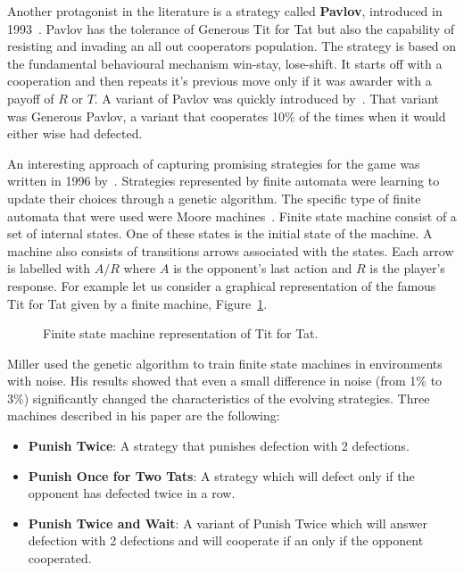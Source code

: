 \documentclass{article}
\theoremstyle{definition}
\begin{document}
Another protagonist in the literature is a strategy called \textbf{Pavlov},
introduced in 1993~\cite{Nowak1993}. Pavlov has the tolerance of Generous Tit for Tat
but also the capability of resisting and invading an all out cooperators population.
The strategy is based on the fundamental behavioural mechanism win-stay,
lose-shift. It starts off with a cooperation and then repeats it's previous move
only if it was awarder with a payoff of \(R\) or \(T\). A variant of Pavlov
was quickly introduced by~\cite{Wu1995}. That variant was Generous Pavlov, a variant
that cooperates 10\% of the times when it would either wise had defected.

An interesting approach of capturing promising strategies for the game
was written in 1996 by~\cite{Miller1996}. Strategies represented by finite automata
were learning to update their choices through a genetic algorithm.
The specific type of finite automata that were used were Moore machines~\cite{moore1956}.
Finite state machine consist of a set of internal states. One of these states
is the initial state of the machine. A machine also consists of transitions
arrows associated with the states. Each arrow is labelled with \(A/R\) where
\(A\) is the opponent's last action and \(R\) is the player's response.
For example let us consider a graphical representation of the famous Tit for Tat
given by a finite machine, Figure~\ref{fig:tit_for_tat_fsm}.

\begin{figure}[!hbtp]
    \centering
    
    \caption{Finite state machine representation of Tit for Tat.}
    \label{fig:tit_for_tat_fsm}
\end{figure}

Miller used the genetic algorithm to train finite state machines in
environments with noise. His results showed that even a small difference in noise
(from 1\% to 3\%) significantly changed the characteristics of the
evolving strategies. Three machines described in his paper are the following:

\begin{itemize}
    \item \textbf{Punish Twice}: A strategy that punishes defection with 2 defections.
    \item \textbf{Punish Once for Two Tats}: A strategy which will defect only if the
    opponent has defected twice in a row.
    \item \textbf{Punish Twice and Wait}: A variant of Punish Twice which will
    answer defection with 2 defections and will cooperate if an only if the opponent
    cooperated.
\end{itemize}
\end{document}
